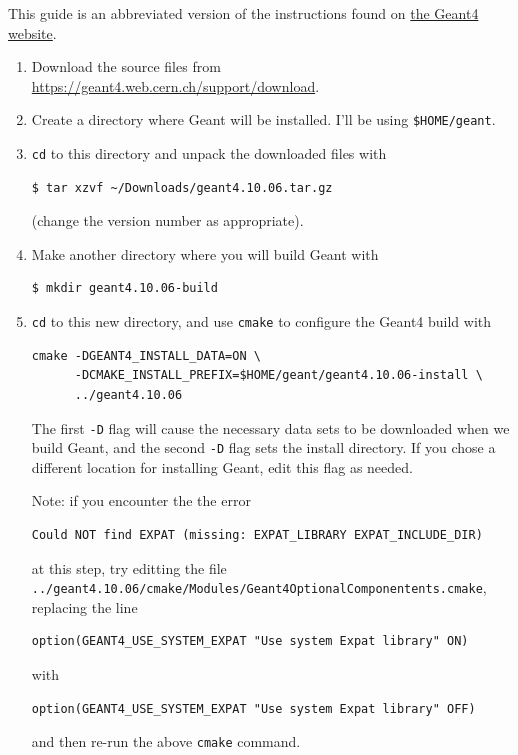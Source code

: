 \documentclass[12pt]{article}
\begin{document}
This guide is an abbreviated version of the instructions found on
\href{http://geant4-userdoc.web.cern.ch/geant4-userdoc/UsersGuides/InstallationGuide/html/}{the
Geant4 website}.
\begin{enumerate}
\item
Download the source files from \url{https://geant4.web.cern.ch/support/download}.

\item
Create a directory where Geant will be installed.  I'll be using \texttt{\$HOME/geant}.

\item
\texttt{cd} to this directory and unpack the downloaded files with
\begin{verbatim}
$ tar xzvf ~/Downloads/geant4.10.06.tar.gz
\end{verbatim}
(change the version number as appropriate).

\item
Make another directory where you will build Geant with
\begin{verbatim}
$ mkdir geant4.10.06-build
\end{verbatim}

\item
\texttt{cd} to this new directory, and use \texttt{cmake} to configure the Geant4 build with
\begin{verbatim}
cmake -DGEANT4_INSTALL_DATA=ON \
      -DCMAKE_INSTALL_PREFIX=$HOME/geant/geant4.10.06-install \
      ../geant4.10.06
\end{verbatim}
The first \texttt{-D} flag will cause the necessary data sets to be downloaded when we build Geant, and the second \texttt{-D} flag sets the install directory.
If you chose a different location for installing Geant, edit this flag as needed.

Note: if you encounter the the error
\begin{verbatim}
Could NOT find EXPAT (missing: EXPAT_LIBRARY EXPAT_INCLUDE_DIR)
\end{verbatim}
at this step, try editting the file \\
\texttt{../geant4.10.06/cmake/Modules/Geant4OptionalComponentents.cmake}, \\
replacing the line
\begin{verbatim}
option(GEANT4_USE_SYSTEM_EXPAT "Use system Expat library" ON)
\end{verbatim}
with
\begin{verbatim}
option(GEANT4_USE_SYSTEM_EXPAT "Use system Expat library" OFF)
\end{verbatim}
and then re-run the above \texttt{cmake} command.


\end{enumerate}
\end{document}

